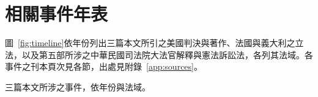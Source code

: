 \chapter{相關事件年表}
\label{app:timeline}

圖~\ref{fig:timeline}依年份列出三篇本文所引之美國判決與著作、法國與義大利之立法，以及第五部所涉之中華民國司法院大法官解釋與憲法訴訟法，各列其法域。各事件之刊本頁次見各節，出處見附錄~\ref{app:sources}。

\begin{qafigure}[相關事件年表]{三篇本文所涉之事件，依年份與法域。\label{fig:timeline}}

\end{qafigure}
